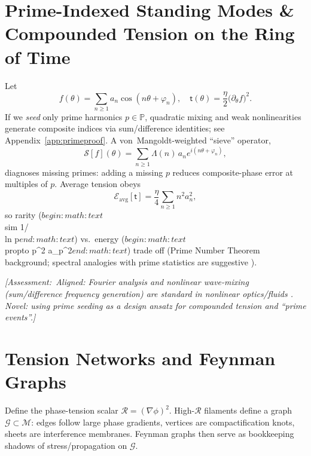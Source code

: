 \documentclass[reprint,amsmath,amssymb,aps]{revtex4-2}
\newcommand{\Primes}{\mathbb{P}}              %
\newcommand{\M}{\mathcal{M}}                   %
\newcommand{\R}{\mathcal{R}}                   %
\newcommand{\grad}{\nabla}                     %
\newcommand{\Eavg}{\mathcal{E}_{\!\mathrm{avg}}}
\newcommand{\taufield}{\mathsf{t}}             %
\newcommand{\Assessment}[1]{\par\smallskip\noindent\textit{\color{blue}[Assessment:\ #1]}\par\smallskip}
\begin{document}
\section{Prime-Indexed Standing Modes \& Compounded Tension on the Ring of Time}
Let
\begin{equation}
  f(\theta)=\sum_{n\ge1} a_n \cos(n\theta+\varphi_n),\quad
  \taufield(\theta)=\frac{\eta}{2}\big(\partial_\theta f\big)^2.
  \label{eq:fourier-tension}
\end{equation}
If we \emph{seed} only prime harmonics $p\in\Primes$, quadratic mixing and weak nonlinearities generate composite indices via sum/difference identities; see Appendix~\ref{app:primeproof}. A von~Mangoldt-weighted ``sieve'' operator,
\begin{equation}
  \mathcal{S}[f](\theta)=\sum_{n\ge1}\Lambda(n)\, a_n e^{i(n\theta+\varphi_n)},
  \label{eq:vonmangoldt}
\end{equation}
diagnoses missing primes: adding a missing $p$ reduces composite-phase error at multiples of $p$. Average tension obeys
\begin{equation}
  \Eavg[\taufield]=\frac{\eta}{4}\sum_{n\ge1} n^2 a_n^2,
  \label{eq:avg-tension}
\end{equation}
so rarity ($begin:math:text$\\sim 1/\\ln p$end:math:text$) vs.\ energy ($begin:math:text$\\propto p^2 a_p^2$end:math:text$) trade off (Prime Number Theorem background; spectral analogies with prime statistics are suggestive \cite{Montgomery1973,BerryKeating1999}).

\Assessment{Aligned: Fourier analysis and nonlinear wave-mixing (sum/difference frequency generation) are standard in nonlinear optics/fluids \cite{BoydNLO}. Novel: using prime seeding as a \emph{design ansatz} for compounded tension and ``prime events''.}

\section{Tension Networks and Feynman Graphs}
Define the phase-tension scalar $\R = (\grad\phi)^2$. High-$\R$ filaments define a graph $\mathcal{G}\subset\M$: edges follow large phase gradients, vertices are compactification knots, sheets are interference membranes. Feynman graphs then serve as bookkeeping shadows of stress/propagation on $\mathcal{G}$.
\end{document}
